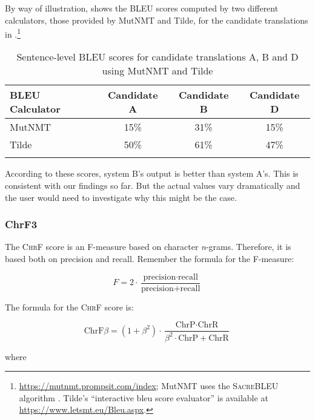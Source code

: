\documentclass[output=paper]{langscibook}
\begin{document}
By way of illustration,  shows the BLEU scores computed by two different calculators, those provided by MutNMT and Tilde, for the candidate translations in .\footnote{\url{https://mutnmt.prompsit.com/index}; MutNMT uses the \textsc{SacreBLEU} algorithm \citep{Post2018}. Tilde’s “interactive bleu score evaluator” is available at \url{https://www.letsmt.eu/Bleu.aspx}.}


\begin{table}
\begin{tabular}{lccc}
\lsptoprule
{BLEU Calculator} & {Candidate A} & {Candidate B} & {Candidate D}\\
\midrule
MutNMT & 15\% & 31\% & 15\%\\
Tilde & 50\% & 61\% & 47\%\\
\lspbottomrule
\end{tabular}
\caption{Sentence-level BLEU scores for candidate translations A, B and D using MutNMT and Tilde\label{tab:rossi:13}}
\end{table}

According to these scores, system B’s output is better than system A’s. This is consistent with our findings so far. But the actual values vary dramatically and the user would need to investigate why this might be the case. 

\subsubsection{\label{bkm:Ref57827977}ChrF3}

The \textsc{ChrF} score is an F-measure based on character \textit{n}{}-grams. Therefore, it is based both on precision and recall. Remember the formula for the F-measure:


\begin{equation}
F=2 \cdot \frac{\text{precision} \cdot \text{recall}}{\text{precision}+\text{recall}}
\end{equation}

The formula for the \textsc{ChrF} score is:

\begin{equation}
\text{ChrF}\beta =\left(1+\beta^2\right) \cdot \frac{\text{ChrP} \cdot \text{ChrR}}{\beta^2 \cdot \text{ChrP}+\text{ChrR}}
\end{equation}

where
\end{document}
